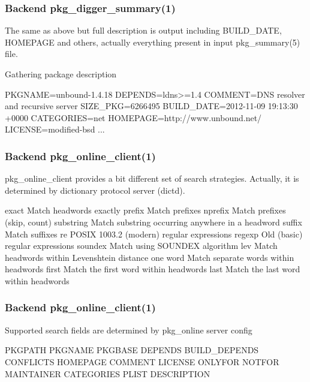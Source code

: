 \documentclass[hyperref=unicode,ascii,xcolor=dvipsnames]{beamer}
\begin{document}

\begin{frame}[fragile]
  \frametitle{Backend pkg\_digger\_summary(1)}
    The same as above but full description is output including
BUILD\_DATE, HOMEPAGE and others, actually everything present
in input pkg\_summary(5) file.
   \begin{block}{Gathering package description}
    \begin{Code}{}
PKGNAME=unbound-1.4.18
DEPENDS=ldns>=1.4
COMMENT=DNS resolver and recursive server
SIZE\_PKG=6266495
BUILD\_DATE=2012-11-09 19:13:30 +0000
CATEGORIES=net
HOMEPAGE=http://www.unbound.net/
LICENSE=modified-bsd
...
\prompt{#}
    \end{Code}
  \end{block}
\end{frame}


\begin{frame}[fragile]
  \frametitle{Backend pkg\_online\_client(1)}
  pkg\_online\_client provides a bit different set of search strategies.
  Actually, it is determined by dictionary protocol server (dictd).
    \scriptsize
  \begin{block}{}
    \begin{Code}{}
      exact    Match headwords exactly
     prefix    Match prefixes
    nprefix    Match prefixes (skip, count)
  substring    Match substring occurring anywhere
               in a headword
     suffix    Match suffixes
         re    POSIX 1003.2 (modern) regular expressions
     regexp    Old (basic) regular expressions
    soundex    Match using SOUNDEX algorithm
        lev    Match headwords within
               Levenshtein distance one
       word    Match separate words within headwords
      first    Match the first word within headwords
       last    Match the last word within headwords
\prompt{#}
    \end{Code}
  \end{block}
\end{frame}


\begin{frame}[fragile]
  \frametitle{Backend pkg\_online\_client(1)}
  Supported search fields are determined by pkg\_online server config
  \begin{block}{}
    \scriptsize
    \begin{Code}{}
PKGPATH
PKGNAME
PKGBASE
DEPENDS
BUILD\_DEPENDS
CONFLICTS
HOMEPAGE
COMMENT
LICENSE
ONLYFOR
NOTFOR
MAINTAINER
CATEGORIES
PLIST
DESCRIPTION
\prompt{#}
    \end{Code}
  \end{block}
\end{frame}
\end{document}
